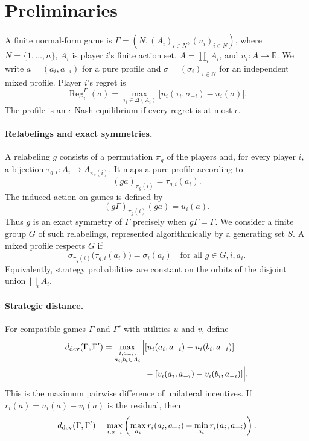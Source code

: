 \section{Preliminaries}

A finite normal-form game is $\Gamma=(N,(A_i)_{i\in N},(u_i)_{i\in N})$, where $N=\{1,\ldots,n\}$, $A_i$ is player $i$'s finite action set, $A=\prod_i A_i$, and $u_i:A\to\mathbb R$.  We write $a=(a_i,a_{-i})$ for a pure profile and $\sigma=(\sigma_i)_{i\in N}$ for an independent mixed profile.  Player $i$'s regret is
\[
\operatorname{Reg}_i^\Gamma(\sigma)
=
\max_{\tau_i\in\Delta(A_i)}
\bigl[u_i(\tau_i,\sigma_{-i})-u_i(\sigma)\bigr].
\]
The profile is an $\epsilon$-Nash equilibrium if every regret is at most $\epsilon$.

\paragraph{Relabelings and exact symmetries.}
A relabeling $g$ consists of a permutation $\pi_g$ of the players and, for every player $i$, a bijection
$\tau_{g,i}:A_i\to A_{\pi_g(i)}$.  It maps a pure profile according to
\[
(ga)_{\pi_g(i)}=\tau_{g,i}(a_i).
\]
The induced action on games is defined by
\[
(g\Gamma)_{\pi_g(i)}(ga)=u_i(a).
\]
Thus $g$ is an exact symmetry of $\Gamma$ precisely when $g\Gamma=\Gamma$.  We consider a finite group $G$ of such relabelings, represented algorithmically by a generating set $S$.  A mixed profile respects $G$ if
\[
\sigma_{\pi_g(i)}\bigl(\tau_{g,i}(a_i)\bigr)=\sigma_i(a_i)
\quad
\text{for all }g\in G,i,a_i.
\]
Equivalently, strategy probabilities are constant on the orbits of the disjoint union $\bigsqcup_i A_i$.

\paragraph{Strategic distance.}
For compatible games $\Gamma$ and $\Gamma'$ with utilities $u$ and $v$, define
\begin{align}
d_{\mathrm{dev}}(\Gamma,\Gamma')
=\max_{\substack{i,a_{-i},\\a_i,b_i\in A_i}}
\Big|&[u_i(a_i,a_{-i})-u_i(b_i,a_{-i})] \nonumber\\
&-[v_i(a_i,a_{-i})-v_i(b_i,a_{-i})]\Big|.
\label{eq:mpd}
\end{align}
This is the maximum pairwise difference of unilateral incentives.  If
$r_i(a)=u_i(a)-v_i(a)$ is the residual, then
\begin{equation}
d_{\mathrm{dev}}(\Gamma,\Gamma')
=
\max_{i,a_{-i}}
\left(
\max_{a_i}r_i(a_i,a_{-i})-\min_{a_i}r_i(a_i,a_{-i})
\right).
\label{eq:range-form}
\end{equation}

